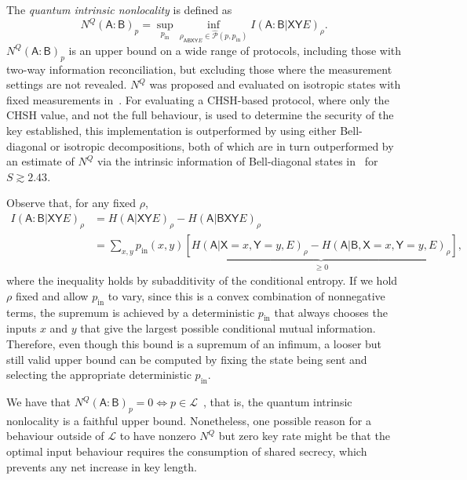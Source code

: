 \documentclass[10pt, a4paper]{article}
\numberwithin{equation}{section} %
\theoremstyle{definition}
\theoremstyle{plain}
\newcommand{\?}{\mathrel{?}} %
\newcommand{\crv}[1]{\mathsf{#1}}
\newcommand{\Ls}{\mathcal{L}}
\newcommand{\compatstates}[3][]{\hat{\mathcal{P}}#1(#2,#3)}
\newcommand{\prin}[1][p]{#1_{\mathrm{in}}}
\begin{document}
    The \emph{quantum intrinsic nonlocality} is defined as~\cite{DIQKD_Limits}
    \begin{equation}
    N^Q{(\crv{A}:\crv{B})}_p = \sup_{\prin} \inf_{\rho_{\crv{ABXY}E}\in\compatstates{p}{\prin}} I{(\crv{A}:\crv{B}|\crv{XY}E)}_{\rho}.
    \end{equation}
    \(N^Q{(\crv{A}:\crv{B})}_p\) is an upper bound on a wide range of protocols, including those with two-way information reconciliation, but excluding those where the measurement settings are not revealed. \(N^Q\) was proposed and evaluated on isotropic states with fixed measurements in~\cite{DIQKD_Limits}. For evaluating a CHSH-based protocol, where only the CHSH value, and not the full behaviour, is used to determine the security of the key established, this implementation is outperformed by  using either Bell-diagonal or isotropic decompositions, both of which are in turn outperformed by an estimate of \(N^Q\) via the intrinsic information of Bell-diagonal states in~\cite[Appendix B]{RevisedPeres} for \(S \gtrsim 2.43\).

    Observe that, for any fixed \(\rho\),
    \begin{align}
      I{(\crv{A}:\crv{B}|\crv{XY}E)}_{\rho} &= H{(\crv{A}|\crv{XY}E)}_{\rho} - H{(\crv{A}|\crv{BXY}E)}_{\rho} \\
                                            &= \sum_{x,y} \prin(x,y) \underbrace{\left[ H{(\crv{A}|\crv{X}=x,\crv{Y}=y,E)}_{\rho} - H{(\crv{A}|\crv{B},\crv{X}=x,\crv{Y}=y,E)}_{\rho} \right]}_{\geq 0},
    \end{align}
    where the inequality holds by subadditivity of the conditional entropy. If we hold \(\rho\) fixed and allow \(\prin\) to vary, since this is a convex combination of nonnegative terms, the supremum is achieved by a deterministic \(\prin\) that always chooses the inputs \(x\) and \(y\) that give the largest possible conditional mutual information. Therefore, even though this bound is a supremum of an infimum, a looser but still valid upper bound can be computed by fixing the state being sent and selecting the appropriate deterministic \(\prin\).

    We have that \(N^Q{(\crv{A}:\crv{B})}_p = 0 \Leftrightarrow p \in \Ls\)~\cite[Thm 20]{DIQKD_Limits}, that is, the quantum intrinsic nonlocality is a faithful upper bound. Nonetheless, one possible reason for a behaviour outside of \(\Ls\) to have nonzero \(N^Q\) but zero key rate might be that the optimal input behaviour requires the consumption of shared secrecy, which prevents any net increase in key length.
\end{document}
